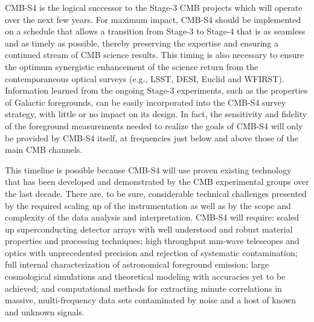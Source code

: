 %


CMB-S4 is the logical successor to the Stage-3 CMB projects which will operate over the next few years. For maximum impact, CMB-S4 should be implemented on a schedule that allows a transition from Stage-3 to Stage-4 that is as seamless and as timely as possible, thereby preserving the expertise and ensuring a continued stream of CMB science results. This timing is also necessary to ensure the optimum synergistic enhancement of the science return from the contemporaneous optical surveys (e.g., LSST, DESI, Euclid and WFIRST).   Information learned from the ongoing Stage-3 experiments, such as the properties of Galactic foregrounds, can be easily incorporated into the CMB-S4 survey strategy, with little or no impact on its design. In fact, the sensitivity and fidelity of the foreground measurements needed to realize the goals of CMB-S4 will only be provided by CMB-S4 itself, at frequencies just below and above those of the main CMB channels.

This timeline is possible because CMB-S4 will use proven existing technology that has been developed and demonstrated by the CMB experimental groups over the last decade. There are, to be sure, considerable technical challenges presented by the required scaling up of the instrumentation as well as by the scope and complexity of the data analysis and interpretation.  CMB-S4 will require: scaled up superconducting detector arrays with well understood and robust material properties and processing techniques; high throughput mm-wave telescopes and optics with unprecedented precision and rejection of systematic contamination; full internal characterization of astronomical foreground emission; large cosmological simulations and theoretical modeling with accuracies yet to be achieved; and computational methods for extracting minute correlations in massive, multi-frequency data sets contaminated by noise and a host of known and unknown signals. 


